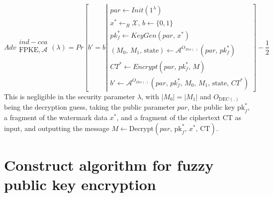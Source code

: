 \documentclass[graybox]{svmult}
\begin{document}
\begin{equation*}
    Adv\begin{array}{c}
        ind-cca                  \\
        \text{FPKE}, \mathcal{A} \\
    \end{array} (\lambda)
    =
    Pr\left[b'= b \left| \begin{array}{c}
            par  \leftarrow Init(1^\lambda)                                                         \\
            x^* \leftarrow_{R} \mathcal{X}, \, b \leftarrow \{0, 1 \}                               \\
            pk^*_f \leftarrow KeyGen(par , \, x^*)                                                  \\

            (M_{0}, \, M_{1}, \, \text{state}) \leftarrow \mathcal{A}^{O_{Dec(.)}}(par , \, pk^*_f) \\
            CT^* \leftarrow Encrypt(par , \, pk^*_f, \, M)                                          \\
            b' \leftarrow \mathcal{A}^{O_{Dec(.)}}(par  , \, pk^*_f, \, M_0, \, M_1, \, \text{state}, \, CT^*)
        \end{array} \right. \right] - \frac{1}{2}
\end{equation*}
This is negligible in the security parameter \( \lambda \), with \( |M_0| = |M_1| \) and \( O_{\text{DEC}(.)} \) \allowbreak being the decryption guess, taking the public parameter \(  par \), the public key \( \text{pk}_f^* \), a \allowbreak fragment of the watermark data \( x^* \), and a fragment of the ciphertext \( \text{CT} \) as input, and \allowbreak outputting the message \( M \leftarrow \text{Decrypt}(par ,\, \text{pk}_f^*,\, x^*,\, \text{CT}) \).


\section{Construct algorithm for fuzzy public key encryption}
\end{document}
